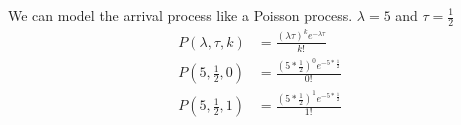 \documentclass[../../probability-notes.tex]{subfiles}
\begin{document}
        We can model the arrival process like a Poisson process. $\lambda = 5$ and $\tau = \frac{1}{2}$
        \begin{align*}
                P(\lambda, \tau, k) &= \frac{(\lambda \tau)^{k} e^{-\lambda \tau}}{k!} \\
                P(5, \frac{1}{2}, 0) &= \frac{(5 * \frac{1}{2})^{0} e^{-5 * \frac{1}{2}}}{0!} \\
                P(5, \frac{1}{2}, 1) &= \frac{(5 * \frac{1}{2})^{1} e^{-5 * \frac{1}{2}}}{1!}
        \end{align*}
\end{document}
